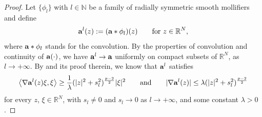 \documentclass[12pt]{amsart}
\theoremstyle{definition}
\theoremstyle{remark}
\theoremstyle{conclusion}
\theoremstyle{conjecture}
\numberwithin{equation}{section}
\begin{document}
\begin{proof}
\smallskip

Let $\{\phi _l\}$ with $l\in\mathbb{N}$ be a family of radially symmetric smooth mollifiers and define
\begin{equation*}
 {\bf{a}}^l(z):=({\bf{a}}\ast \phi_l)(z)\qquad \text{for}\,\, z\in\mathbb{R}^N,
\end{equation*}
where ${\bf{a}}\ast\phi_l$ stands for the convolution. By the properties of convolution and continuity of ${\bf{a}}(\cdot)$, we have
${\bf{a}}^l\rightarrow {\bf{a}}$ uniformly on compact subsets of $\mathbb{R}^N$, as $l\rightarrow+\infty$.  By \cite[Lemma 2.4]{FF} and its proof therein, we know that
${\bf{a}}^l$ satisfies
\begin{equation}\label{eq3.5}
 \left\langle \nabla {\bf{a}}^l(z)\xi,\xi\right\rangle\geq\frac{1}{\lambda}(|z|^2+s_l^2)^{\frac{p-2}{2}}|\xi|^2
 \qquad \text{and}\qquad |\nabla {\bf{a}}^l(z)|\leq \lambda (|z|^2+s_l^2)^{\frac{p-2}{2}}
\end{equation}
for every $z$, $\xi\in\mathbb{R}^N$, with $s_l\neq0$ and $s_l\rightarrow0$ as $l\rightarrow+\infty$, and some constant $\lambda>0$.




\end{proof}
\end{document}
